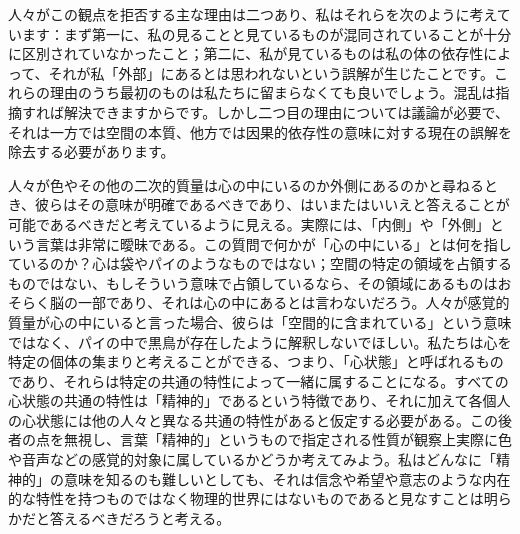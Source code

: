 \documentclass[a4paper,11pt,openany]{ltjsbook}
\begin{document}
人々がこの観点を拒否する主な理由は二つあり、私はそれらを次のように考えています：まず第一に、私の見ることと見ているものが混同されていることが十分に区別されていなかったこと；第二に、私が見ているものは私の体の依存性によって、それが私「外部」にあるとは思われないという誤解が生じたことです。これらの理由のうち最初のものは私たちに留まらなくても良いでしょう。混乱は指摘すれば解決できますからです。しかし二つ目の理由については議論が必要で、それは一方では空間の本質、他方では因果的依存性の意味に対する現在の誤解を除去する必要があります。

人々が色やその他の二次的質量は心の中にいるのか外側にあるのかと尋ねるとき、彼らはその意味が明確であるべきであり、はいまたはいいえと答えることが可能であるべきだと考えているように見える。実際には、「内側」や「外側」という言葉は非常に曖昧である。この質問で何かが「心の中にいる」とは何を指しているのか？心は袋やパイのようなものではない；空間の特定の領域を占領するものではない、もしそういう意味で占領しているなら、その領域にあるものはおそらく脳の一部であり、それは心の中にあるとは言わないだろう。人々が感覚的質量が心の中にいると言った場合、彼らは「空間的に含まれている」という意味ではなく、パイの中で黒鳥が存在したように解釈しないでほしい。私たちは心を特定の個体の集まりと考えることができる、つまり、「心状態」と呼ばれるものであり、それらは特定の共通の特性によって一緒に属することになる。すべての心状態の共通の特性は「精神的」であるという特徴であり、それに加えて各個人の心状態には他の人々と異なる共通の特性があると仮定する必要がある。この後者の点を無視し、言葉「精神的」というもので指定される性質が観察上実際に色や音声などの感覚的対象に属しているかどうか考えてみよう。私はどんなに「精神的」の意味を知るのも難しいとしても、それは信念や希望や意志のような内在的な特性を持つものではなく物理的世界にはないものであると見なすことは明らかだと答えるべきだろうと考える。
\end{document}
